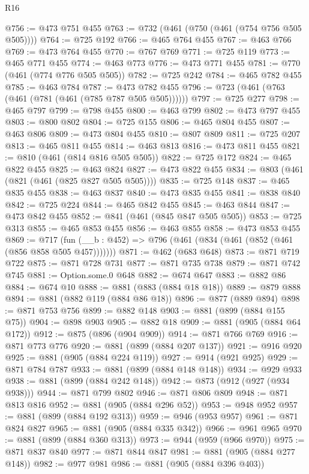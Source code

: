 \begin{lexlean}{R16}
\begin{coremodule}
@756 := @473 @751 @455
@763 := @732 (@461 (@750 (@461 (@754 @756 @505 @505))))
@764 := @725 @192
@766 := @465 @764 @455
@767 := @463 @766
@769 := @473 @764 @455
@770 := @767 @769
@771 := @725 @119
@773 := @465 @771 @455
@774 := @463 @773
@776 := @473 @771 @455
@781 := @770 (@461 (@774 @776 @505 @505))
@782 := @725 @242
@784 := @465 @782 @455
@785 := @463 @784
@787 := @473 @782 @455
@796 := @723 (@461 (@763 (@461 (@781 (@461 (@785 @787 @505 @505))))))
@797 := @725 @277
@798 := @465 @797
@799 := @798 @455
@800 := @463 @799
@802 := @473 @797 @455
@803 := @800 @802
@804 := @725 @155
@806 := @465 @804 @455
@807 := @463 @806
@809 := @473 @804 @455
@810 := @807 @809
@811 := @725 @207
@813 := @465 @811 @455
@814 := @463 @813
@816 := @473 @811 @455
@821 := @810 (@461 (@814 @816 @505 @505))
@822 := @725 @172
@824 := @465 @822 @455
@825 := @463 @824
@827 := @473 @822 @455
@834 := @803 (@461 (@821 (@461 (@825 @827 @505 @505))))
@835 := @725 @148
@837 := @465 @835 @455
@838 := @463 @837
@840 := @473 @835 @455
@841 := @838 @840
@842 := @725 @224
@844 := @465 @842 @455
@845 := @463 @844
@847 := @473 @842 @455
@852 := @841 (@461 (@845 @847 @505 @505))
@853 := @725 @313
@855 := @465 @853 @455
@856 := @463 @855
@858 := @473 @853 @455
@869 := @717 (fun (__b : @452) => @796 (@461 (@834 (@461 (@852 (@461 (@856 @858 @505 @457)))))))
@871 := @462 (@683 @648)
@873 := @871 @719 @722
@875 := @871 @728 @731
@877 := @871 @735 @738
@879 := @871 @742 @745
@881 := Option.some.{0} @648
@882 := @674 @647
@883 := @882 @86
@884 := @674 @10
@888 := @881 (@883 (@884 @18 @18))
@889 := @879 @888
@894 := @881 (@882 @119 (@884 @86 @18))
@896 := @877 (@889 @894)
@898 := @871 @753 @756
@899 := @882 @148
@903 := @881 (@899 (@884 @155 @75))
@904 := @898 @903
@905 := @882 @18
@909 := @881 (@905 (@884 @64 @172))
@912 := @875 (@896 (@904 @909))
@914 := @871 @766 @769
@916 := @871 @773 @776
@920 := @881 (@899 (@884 @207 @137))
@921 := @916 @920
@925 := @881 (@905 (@884 @224 @119))
@927 := @914 (@921 @925)
@929 := @871 @784 @787
@933 := @881 (@899 (@884 @148 @148))
@934 := @929 @933
@938 := @881 (@899 (@884 @242 @148))
@942 := @873 (@912 (@927 (@934 @938)))
@944 := @871 @799 @802
@946 := @871 @806 @809
@948 := @871 @813 @816
@952 := @881 (@905 (@884 @296 @52))
@953 := @948 @952
@957 := @881 (@899 (@884 @192 @313))
@959 := @946 (@953 @957)
@961 := @871 @824 @827
@965 := @881 (@905 (@884 @335 @342))
@966 := @961 @965
@970 := @881 (@899 (@884 @360 @313))
@973 := @944 (@959 (@966 @970))
@975 := @871 @837 @840
@977 := @871 @844 @847
@981 := @881 (@905 (@884 @277 @148))
@982 := @977 @981
@986 := @881 (@905 (@884 @396 @403))

\end{coremodule}
\end{lexlean}
